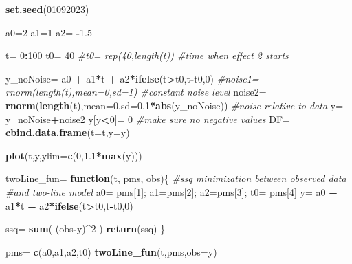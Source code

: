 \documentclass[
]{article}
\newenvironment{Shaded}{\begin{snugshade}}{\end{snugshade}}
\newcommand{\AttributeTok}[1]{\textcolor[rgb]{0.13,0.29,0.53}{#1}}
\newcommand{\CommentTok}[1]{\textcolor[rgb]{0.56,0.35,0.01}{\textit{#1}}}
\newcommand{\ControlFlowTok}[1]{\textcolor[rgb]{0.13,0.29,0.53}{\textbf{#1}}}
\newcommand{\DecValTok}[1]{\textcolor[rgb]{0.00,0.00,0.81}{#1}}
\newcommand{\FloatTok}[1]{\textcolor[rgb]{0.00,0.00,0.81}{#1}}
\newcommand{\FunctionTok}[1]{\textcolor[rgb]{0.13,0.29,0.53}{\textbf{#1}}}
\newcommand{\NormalTok}[1]{#1}
\newcommand{\OtherTok}[1]{\textcolor[rgb]{0.56,0.35,0.01}{#1}}
\newcommand{\SpecialCharTok}[1]{\textcolor[rgb]{0.81,0.36,0.00}{\textbf{#1}}}
\begin{document}
\begin{Shaded}
\begin{Highlighting}[]
\FunctionTok{set.seed}\NormalTok{(}\DecValTok{01092023}\NormalTok{)}

\NormalTok{a0}\OtherTok{=}\DecValTok{2}
\NormalTok{a1}\OtherTok{=}\DecValTok{1}
\NormalTok{a2}\OtherTok{=} \SpecialCharTok{{-}}\FloatTok{1.5}

\NormalTok{t}\OtherTok{=} \DecValTok{0}\SpecialCharTok{:}\DecValTok{100}
\NormalTok{t0}\OtherTok{=} \DecValTok{40}
\CommentTok{\#t0= rep(40,length(t))  \#time when effect 2 starts}

\NormalTok{y\_noNoise}\OtherTok{=}\NormalTok{ a0 }\SpecialCharTok{+}\NormalTok{ a1}\SpecialCharTok{*}\NormalTok{t }\SpecialCharTok{+}\NormalTok{ a2}\SpecialCharTok{*}\FunctionTok{ifelse}\NormalTok{(t}\SpecialCharTok{\textgreater{}}\NormalTok{t0,t}\SpecialCharTok{{-}}\NormalTok{t0,}\DecValTok{0}\NormalTok{)}
\CommentTok{\#noise1= rnorm(length(t),mean=0,sd=1)  \#constant noise level}
\NormalTok{noise2}\OtherTok{=} \FunctionTok{rnorm}\NormalTok{(}\FunctionTok{length}\NormalTok{(t),}\AttributeTok{mean=}\DecValTok{0}\NormalTok{,}\AttributeTok{sd=}\FloatTok{0.1}\SpecialCharTok{*}\FunctionTok{abs}\NormalTok{(y\_noNoise))  }\CommentTok{\#noise relative to data}
\NormalTok{y}\OtherTok{=}\NormalTok{ y\_noNoise}\SpecialCharTok{+}\NormalTok{noise2}
\NormalTok{y[y}\SpecialCharTok{\textless{}}\DecValTok{0}\NormalTok{]}\OtherTok{=} \DecValTok{0}   \CommentTok{\#make sure no negative values}
\NormalTok{DF}\OtherTok{=} \FunctionTok{cbind.data.frame}\NormalTok{(}\AttributeTok{t=}\NormalTok{t,}\AttributeTok{y=}\NormalTok{y)}

\FunctionTok{plot}\NormalTok{(t,y,}\AttributeTok{ylim=}\FunctionTok{c}\NormalTok{(}\DecValTok{0}\NormalTok{,}\FloatTok{1.1}\SpecialCharTok{*}\FunctionTok{max}\NormalTok{(y)))}

\NormalTok{twoLine\_fun}\OtherTok{=} \ControlFlowTok{function}\NormalTok{(t, pms, obs)\{  }\CommentTok{\#ssq minimization between observed data}
                                       \CommentTok{\#and two{-}line model}
\NormalTok{  a0}\OtherTok{=}\NormalTok{ pms[}\DecValTok{1}\NormalTok{]; a1}\OtherTok{=}\NormalTok{pms[}\DecValTok{2}\NormalTok{]; a2}\OtherTok{=}\NormalTok{pms[}\DecValTok{3}\NormalTok{]; t0}\OtherTok{=}\NormalTok{ pms[}\DecValTok{4}\NormalTok{]}
\NormalTok{  y}\OtherTok{=}\NormalTok{ a0 }\SpecialCharTok{+}\NormalTok{ a1}\SpecialCharTok{*}\NormalTok{t }\SpecialCharTok{+}\NormalTok{ a2}\SpecialCharTok{*}\FunctionTok{ifelse}\NormalTok{(t}\SpecialCharTok{\textgreater{}}\NormalTok{t0,t}\SpecialCharTok{{-}}\NormalTok{t0,}\DecValTok{0}\NormalTok{)}
  
\NormalTok{  ssq}\OtherTok{=} \FunctionTok{sum}\NormalTok{( (obs}\SpecialCharTok{{-}}\NormalTok{y)}\SpecialCharTok{\^{}}\DecValTok{2}\NormalTok{ )}
  \FunctionTok{return}\NormalTok{(ssq)}
\NormalTok{\}}

\NormalTok{pms}\OtherTok{=} \FunctionTok{c}\NormalTok{(a0,a1,a2,t0)}
\FunctionTok{twoLine\_fun}\NormalTok{(t,pms,}\AttributeTok{obs=}\NormalTok{y)}
\end{Highlighting}
\end{Shaded}
\end{document}
